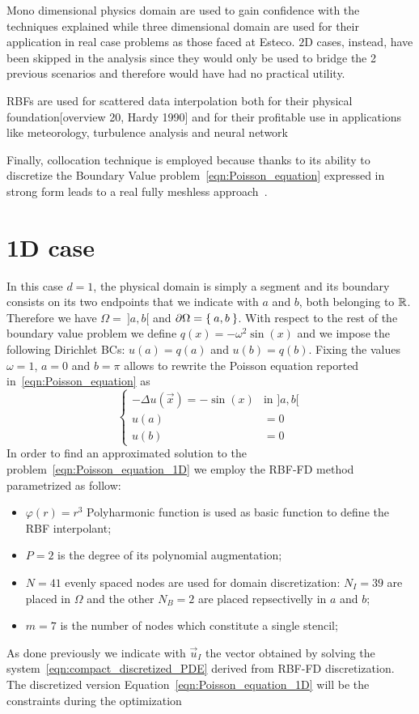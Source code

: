 Mono dimensional physics domain are used to gain confidence with the techniques explained while three dimensional  domain are used for their application in real case problems as those faced at Esteco. $2$D cases, instead, have been skipped in the analysis since they would only be used to bridge the 2 previous scenarios and therefore would have had no practical utility.

RBFs are used for scattered data interpolation both for their physical foundation[overview 20, Hardy 1990] and for their profitable use in applications like meteorology, turbulence analysis and neural network~\cite{Chen:meshless_overview_after_20_years}

Finally, collocation technique is employed because thanks to its ability to discretize the Boundary Value problem~\eqref{eqn:Poisson_equation} expressed in strong form leads to a real fully meshless approach~\cite{Miotti:RBF_in_depth}.


\section{1D case}

In this case $d=1$, the physical domain is simply a segment and its boundary consists on its two endpoints that we indicate with $a$ and $b$, both belonging to $\mathbb{R}$. Therefore we have $\Omega =~]a,b[$ and $\partial\Omega = \Set{a, b}$.
With respect to the rest of the boundary value problem we define $q(x) = - \omega^2 \sin(x)$ and we impose the following Dirichlet BCs: $u(a)=q(a)$ and $u(b)=q(b)$. Fixing the values $\omega=1$, $a=0$ and $b=\pi$ allows to rewrite the Poisson equation reported in~\eqref{eqn:Poisson_equation} as
\begin{equation}
	\label{eqn:Poisson_equation_1D}
	\begin{cases}
		- \Delta u(\vec{x}) = - \sin(x)  &  \text{in $]a,b[$}  \\
		u(a) &= 0  \\
		u(b) &= 0
	\end{cases}
\end{equation}
In order to find an approximated solution to the problem~\eqref{eqn:Poisson_equation_1D} we employ the RBF-FD method parametrized as follow:
\begin{itemize}
	\item $\varphi(r) = r^3$ Polyharmonic function is used as basic function to define the RBF interpolant;
	\item $P=2$ is the degree of its polynomial augmentation;
	\item $N=41$ evenly spaced nodes are used for domain discretization: $N_I=39$ are placed in $\Omega$ and the other $N_B=2$ are placed repsectivelly in $a$ and $b$;
	\item $m=7$ is the number of nodes which constitute a single stencil;
\end{itemize}
As done previously we indicate with $\vec{u}_I$ the vector obtained by solving the system~\eqref{eqn:compact_discretized_PDE} derived from RBF-FD discretization.
The discretized version Equation~\eqref{eqn:Poisson_equation_1D} will be the constraints during the optimization

